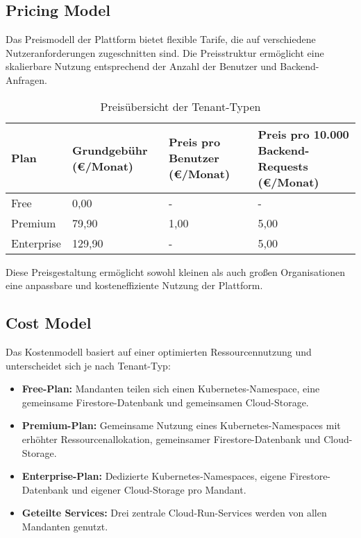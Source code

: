 \subsection{Pricing Model}
Das Preismodell der Plattform bietet flexible Tarife, die auf verschiedene Nutzeranforderungen zugeschnitten sind.
Die Preisstruktur ermöglicht eine skalierbare Nutzung entsprechend der Anzahl der Benutzer und Backend-Anfragen.

\begin{table}[h!]
	\centering
	\caption{Preisübersicht der Tenant-Typen}
	{
		\begin{tabularx}{\textwidth}{|l|X|X|X|}
			\hline
			\textbf{Plan} & \textbf{Grundgebühr (€/Monat)} & \textbf{Preis pro Benutzer (€/Monat)} & \textbf{Preis pro 10.000 Backend-Requests (€/Monat)} \\ \hline
			Free          & 0,00                           & -                                     & -                                                    \\ \hline
			Premium       & 79,90                          & 1,00                                  & 5,00                                                 \\ \hline
			Enterprise    & 129,90                         & -                                     & 5,00                                                 \\ \hline
		\end{tabularx}}
	\label{tab:pricing}
\end{table}

Diese Preisgestaltung ermöglicht sowohl kleinen als auch großen Organisationen eine anpassbare und kosteneffiziente Nutzung der Plattform.

\subsection{Cost Model}
Das Kostenmodell basiert auf einer optimierten Ressourcennutzung und unterscheidet sich je nach Tenant-Typ:
\begin{itemize}
	\item \textbf{Free-Plan:} Mandanten teilen sich einen Kubernetes-Namespace, eine gemeinsame Firestore-Datenbank und gemeinsamen Cloud-Storage.
	\item \textbf{Premium-Plan:} Gemeinsame Nutzung eines Kubernetes-Namespaces mit erhöhter Ressourcenallokation, gemeinsamer Firestore-Datenbank und Cloud-Storage.
	\item \textbf{Enterprise-Plan:} Dedizierte Kubernetes-Namespaces, eigene Firestore-Datenbank und eigener Cloud-Storage pro Mandant.
	\item \textbf{Geteilte Services:} Drei zentrale Cloud-Run-Services werden von allen Mandanten genutzt.
\end{itemize}

